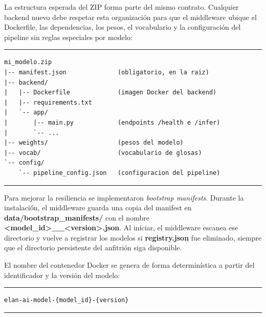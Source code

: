 \documentclass[11pt,a4paper]{article}
\begin{document}
La estructura esperada del ZIP forma parte del mismo contrato. Cualquier backend nuevo debe respetar esta organización para que el middleware ubique el Dockerfile, las dependencias, los pesos, el vocabulario y la configuración del pipeline sin reglas especiales por modelo:

\begin{center}
\begin{minipage}{0.88\textwidth}
\hrule
\vspace{0.12cm}
\small
\begin{Verbatim}[baselinestretch=0.82]
mi_modelo.zip
|-- manifest.json              (obligatorio, en la raiz)
|-- backend/
|   |-- Dockerfile             (imagen Docker del backend)
|   |-- requirements.txt
|   `-- app/
|       |-- main.py            (endpoints /health e /infer)
|       `-- ...
|-- weights/                   (pesos del modelo)
|-- vocab/                     (vocabulario de glosas)
`-- config/
    `-- pipeline_config.json   (configuracion del pipeline)
\end{Verbatim}
\vspace{0.05cm}
\hrule

\label{lst:estructura_zip_modelo}
\end{minipage}
\end{center}

Para mejorar la resiliencia se implementaron \textit{bootstrap manifests}. Durante la instalación, el middleware guarda una copia del manifest en \textbf{data/bootstrap\_manifests/} con el nombre \textbf{<model\_id>\_\_<version>.json}. Al iniciar, el middleware escanea ese directorio y vuelve a registrar los modelos si \textbf{registry.json} fue eliminado, siempre que el directorio persistente del anfitrión siga disponible.

El nombre del contenedor Docker se genera de forma determinística a partir del identificador y la versión del modelo:

\begin{center}
\begin{minipage}{0.55\textwidth}
\hrule
\vspace{0.12cm}
\small
\begin{Verbatim}[baselinestretch=0.82]
elan-ai-model-{model_id}-{version}
\end{Verbatim}
\vspace{0.05cm}
\hrule

\label{lst:nombre_contenedor_modelo}
\end{minipage}
\end{center}
\end{document}
